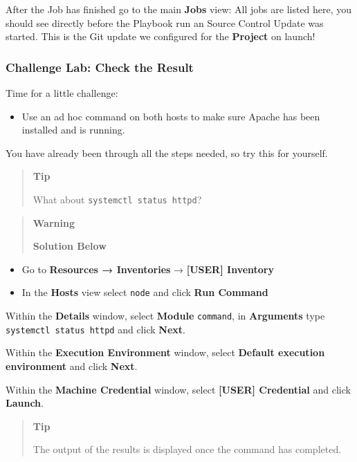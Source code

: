 After the Job has finished go to the main \textbf{Jobs} view: All jobs
are listed here, you should see directly before the Playbook run an
Source Control Update was started. This is the Git update we configured
for the \textbf{Project} on launch!

\hypertarget{challenge-lab-check-the-result}{%
\subsubsection{Challenge Lab: Check the
Result}\label{challenge-lab-check-the-result}}

Time for a little challenge:

\begin{itemize}
\tightlist
\item
  Use an ad hoc command on both hosts to make sure Apache has been
  installed and is running.
\end{itemize}

You have already been through all the steps needed, so try this for
yourself.

\begin{quote}
\textbf{Tip}

What about \texttt{systemctl\ status\ httpd}?
\end{quote}

\begin{quote}
\textbf{Warning}

\textbf{Solution Below}
\end{quote}

\begin{itemize}
\item
  Go to \textbf{Resources → Inventories} → \textbf{[USER] Inventory}
\item
  In the \textbf{Hosts} view select \texttt{node} and click \textbf{Run Command}
\end{itemize}

Within the \textbf{Details} window, select \textbf{Module}
\texttt{command}, in \textbf{Arguments} type
\texttt{systemctl\ status\ httpd} and click \textbf{Next}.

Within the \textbf{Execution Environment} window, select \textbf{Default
execution environment} and click \textbf{Next}.

Within the \textbf{Machine Credential} window, select \textbf{[USER]
Credential} and click \textbf{Launch}.

\begin{quote}
\textbf{Tip}

The output of the results is displayed once the command has completed.
\end{quote}

